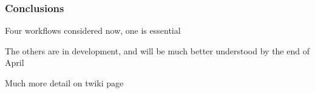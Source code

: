 \documentclass[compress]{beamer}
\begin{document}
\begin{frame}
\frametitle{Conclusions}

\Large

Four workflows considered now, one is essential

\vfill
The others are in development, and will be much better understood by the end of April

\vfill
Much more detail on twiki page

\label{numpages}
\end{frame}




\end{document}
